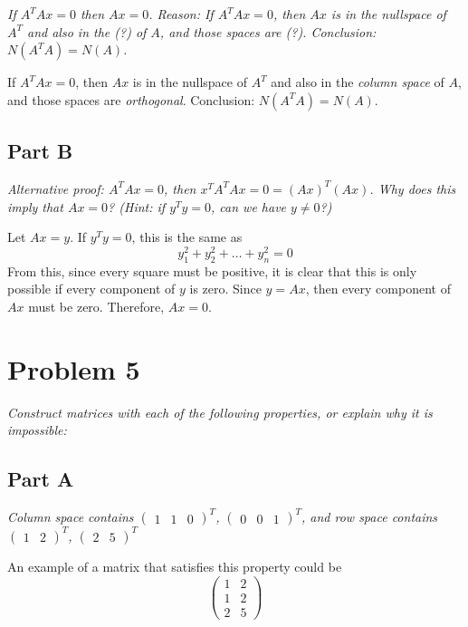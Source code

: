 \documentclass{article}
\begin{document}
\textit{If $A^TAx=0$ then $Ax=0$. Reason: If $A^TAx=0$, then $Ax$ is in the
nullspace of $A^T$ and also in the (?) of $A$, and those spaces are
(?). Conclusion: $N(A^T A) = N(A)$.}

\bigbreak

If $A^TAx=0$, then $Ax$ is in the nullspace of $A^T$ and also in the
\textit{column space} of $A$, and those spaces are \textit{orthogonal}.
Conclusion: $N(A^T A) = N(A)$.

\subsection*{Part B}

\textit{Alternative proof: $A^TAx=0$, then $x^T A^T Ax = 0 = (Ax)^T (Ax)$.
Why does this imply that $Ax=0$? (Hint: if $y^Ty = 0$, can we have $y\ne
0$?)}

\bigbreak

Let $ Ax = y $. If $ y^T y = 0 $, this is the same as
$$ y_1^2 + y_2^2 + \ldots + y_n^2 = 0 $$
From this, since every square must be positive, it is clear that this is only
possible if every component of $ y $ is zero. Since $ y = Ax $, then every
component of $ Ax $ must be zero. Therefore, $ Ax = 0 $.

\section*{Problem 5}

\textit{Construct matrices with each of the following properties, or explain
why it is impossible:}

\subsection*{Part A}

\textit{Column space contains $\begin{pmatrix} 1 & 1 & 0 \end{pmatrix}^T $,
$\begin{pmatrix} 0 & 0 & 1 \end{pmatrix}^T$, and row space contains
$\begin{pmatrix} 1 & 2 \end{pmatrix}^T$, $\begin{pmatrix} 2 & 5
\end{pmatrix}^T$}

\bigbreak

An example of a matrix that satisfies this property could be
$$ \begin{pmatrix}
    1 & 2 \\
    1 & 2 \\
    2 & 5
\end{pmatrix} $$
\end{document}
